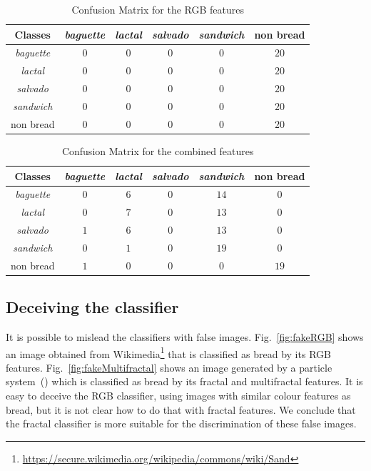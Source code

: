 \documentclass[oneside,a4paper,english,links]{amca}
\begin{document}
\begin{table}[htb]
\centering
\begin{tabular}{|c|c|c|c|c|c|}
    \hline
    Classes & {\em baguette} & {\em lactal} & {\em salvado} & {\em sandwich} & non bread\\
    \hline
    \hline
    {\em baguette}  & $0$ & $0$ & $0$ & $0$ & $20$\\
    \hline
    {\em lactal}    & $0$ & $0$ & $0$ & $0$ & $20$\\
    \hline
    {\em salvado}   & $0$ & $0$ & $0$ & $0$ & $20$\\
    \hline
    {\em sandwich}  & $0$ & $0$ & $0$ & $0$ & $20$\\
    \hline
    non bread       & $0$ & $0$ & $0$ & $0$ & $20$\\
    \hline
\end{tabular}
\caption{Confusion Matrix for the RGB features}
\label{table:ConfusionMatrixNonFractal}
\end{table}

\begin{table}[htb]
\centering
\begin{tabular}{|c|c|c|c|c|c|}
    \hline
    Classes & {\em baguette} & {\em lactal} & {\em salvado} & {\em sandwich} & non bread\\
    \hline
    \hline
    {\em baguette}   & $0$ & $6$ & $0$ & $14$ & $0$\\
    \hline
    {\em lactal}     & $0$ & $7$ & $0$ & $13$ & $0$\\
    \hline
    {\em salvado}    & $1$ & $6$ & $0$ & $13$ & $0$\\
    \hline
    {\em sandwich}   & $0$ & $1$ & $0$ & $19$ & $0$\\
    \hline
    non bread        & $1$ & $0$ & $0$ & $0$  & $19$\\
    \hline
\end{tabular}
\caption{Confusion Matrix for the combined features}
\label{table:ConfusionMatrixCombined}
\end{table}

\subsection{Deceiving the classifier}
It is possible to mislead the classifiers with false images. Fig.~\ref{fig:fakeRGB} shows an image obtained from Wikimedia\footnote{\url{https://secure.wikimedia.org/wikipedia/commons/wiki/Sand}} that is classified as bread by its RGB features. Fig.~\ref{fig:fakeMultifractal} shows an image generated by a particle system~(\cite{Baravalle2011}) which is classified as bread by its fractal and multifractal features. It is easy to deceive the RGB classifier, using images with similar colour features as bread, but it is not clear how to do that with fractal features. We conclude that the fractal classifier is more suitable for the discrimination of these false images.
\end{document}
